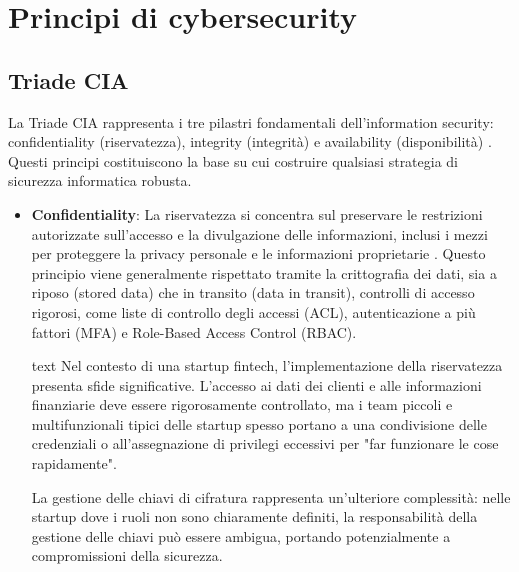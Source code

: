 \documentclass[a4paper,12pt]{report}
\begin{document}
\section{Principi di cybersecurity}
\label{sec:principi-cybersecurity}

\subsection{Triade CIA}
La Triade CIA rappresenta i tre pilastri fondamentali dell'information security: confidentiality (riservatezza), integrity (integrità) e availability (disponibilità) \cite{NIST_SP_1800_26}. Questi principi costituiscono la base su cui costruire qualsiasi strategia di sicurezza informatica robusta.

\begin{itemize}
\item \textbf{Confidentiality}: La riservatezza si concentra sul preservare le restrizioni autorizzate sull'accesso e la divulgazione delle informazioni, inclusi i mezzi per proteggere la privacy personale e le informazioni proprietarie \cite{NIST_SP_1800_26}. Questo principio viene generalmente rispettato tramite la crittografia dei dati, sia a riposo (stored data) che in transito (data in transit), controlli di accesso rigorosi, come liste di controllo degli accessi (ACL), autenticazione a più fattori (MFA) e Role-Based Access Control (RBAC).

text
Nel contesto di una startup fintech, l'implementazione della riservatezza presenta sfide significative. L'accesso ai dati dei clienti e alle informazioni finanziarie deve essere rigorosamente controllato, ma i team piccoli e multifunzionali tipici delle startup spesso portano a una condivisione delle credenziali o all'assegnazione di privilegi eccessivi per "far funzionare le cose rapidamente".

La gestione delle chiavi di cifratura rappresenta un'ulteriore complessità: nelle startup dove i ruoli non sono chiaramente definiti, la responsabilità della gestione delle chiavi può essere ambigua, portando potenzialmente a compromissioni della sicurezza.


\end{itemize}
\end{document}
